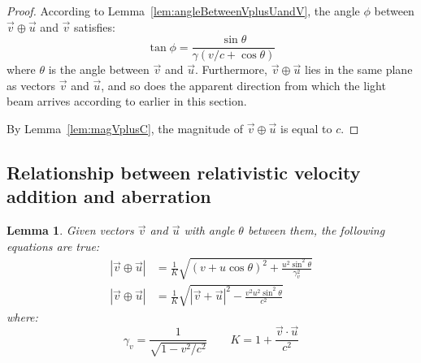 \documentclass[a4paper]{article}
\theoremstyle{plain}
\newtheorem{lemma}[theorem]{Lemma}
\theoremstyle{definition}
\newcommand{\vect}[1]{\vec{#1}}
\begin{document}
\begin{proof}
According to Lemma~\ref{lem:angleBetweenVplusUandV}, the angle $\phi$
between $\vect{v} \oplus \vect{u}$ and $\vect{v}$ satisfies:
\begin{equation}
\tan \phi = \frac{\sin \theta}{\gamma(v/c + \cos \theta)}
\end{equation}
where $\theta$ is the angle between $\vect{v}$ and $\vect{u}$.
Furthermore, $\vect{v} \oplus \vect{u}$ lies in the same plane as
vectors $\vect{v}$ and $\vect{u}$, and so does the apparent direction
from which the light beam arrives according to earlier in this
section.

By Lemma~\ref{lem:magVplusC}, the magnitude of $\vect{v} \oplus
\vect{u}$ is equal to $c$.
\end{proof}


\subsection{Relationship between relativistic velocity addition and aberration}

\begin{lemma}
\label{lem:magnitudeRelVecPlus1}
Given vectors $\vect{v}$ and $\vect{u}$
with angle $\theta$ between them,
the following equations are true:
\begin{align}
|\vect{v} \oplus \vect{u}|
  & = \frac{1}{K} \sqrt{(v + u \cos \theta)^2 + \frac{u^2 \sin^2 \theta}{\gamma_v^2}} \label{eqn:lemmavplusupart1} \\
|\vect{v} \oplus \vect{u}|
  & = \frac{1}{K} \sqrt{|\vect{v} + \vect{u}|^2 - \frac{v^2 u^2 \sin^2 \theta}{c^2}} \label{eqn:lemmavplusupart3}
\end{align}
where:
\begin{equation}
\gamma_v = \frac{1}{\sqrt{1-v^2/c^2}}  \qquad
K = 1 + \frac{\vect{v} \cdot \vect{u}}{c^2}
\end{equation}
\end{lemma}
\end{document}
